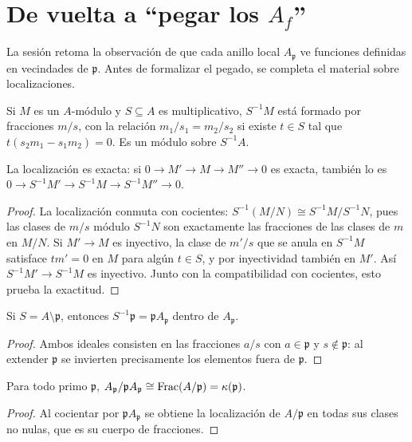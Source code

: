 \section{\texorpdfstring{De vuelta a “pegar los $A_f$”}{De vuelta a pegar los Af}}

La sesión retoma la observación de que cada anillo local $A_{\mathfrak p}$ ve funciones definidas en vecindades de $\mathfrak p$. Antes de formalizar el pegado, se completa el material sobre localizaciones.

\begin{defi}
\label{defi:s04-localizacion-modulo}
Si $M$ es un $A$-módulo y $S\subseteq A$ es multiplicativo, $S^{-1}M$ está formado por fracciones $m/s$, con la relación $m_1/s_1=m_2/s_2$ si existe $t\in S$ tal que $t(s_2m_1-s_1m_2)=0$. Es un módulo sobre $S^{-1}A$.
\end{defi}

\begin{lema}
\label{lema:s04-localizar-exacto}
La localización es exacta: si $0\to M'\to M\to M''\to0$ es exacta, también lo es $0\to S^{-1}M'\to S^{-1}M\to S^{-1}M''\to0$.
\end{lema}
\begin{proof}
La localización conmuta con cocientes: $S^{-1}(M/N)\cong S^{-1}M/S^{-1}N$, pues las clases de $m/s$ módulo $S^{-1}N$ son exactamente las fracciones de las clases de $m$ en $M/N$. Si $M'\to M$ es inyectivo, la clase de $m'/s$ que se anula en $S^{-1}M$ satisface $tm'=0$ en $M$ para algún $t\in S$, y por inyectividad también en $M'$. Así $S^{-1}M'\to S^{-1}M$ es inyectivo. Junto con la compatibilidad con cocientes, esto prueba la exactitud.
\end{proof}

\begin{lema}
\label{lema:s04-s-p-entonces-s-1}
Si $S=A\setminus\mathfrak p$, entonces $S^{-1}\mathfrak p=\mathfrak pA_{\mathfrak p}$ dentro de $A_{\mathfrak p}$.
\end{lema}
\begin{proof}
Ambos ideales consisten en las fracciones $a/s$ con $a\in\mathfrak p$ y $s\notin\mathfrak p$: al extender $\mathfrak p$ se invierten precisamente los elementos fuera de $\mathfrak p$.
\end{proof}

\begin{prop}
\label{prop:s04-todo-primo-p-p-pa}
Para todo primo $\mathfrak p$, $A_{\mathfrak p}/\mathfrak pA_{\mathfrak p}\cong\operatorname{Frac}(A/\mathfrak p)=\kappa(\mathfrak p)$.
\end{prop}
\begin{proof}
Al cocientar por $\mathfrak pA_{\mathfrak p}$ se obtiene la localización de $A/\mathfrak p$ en todas sus clases no nulas, que es su cuerpo de fracciones.
\end{proof}

